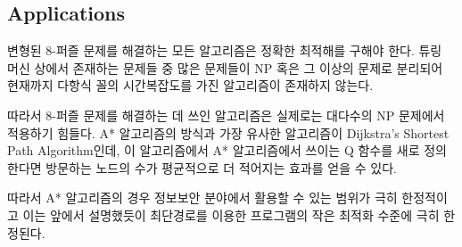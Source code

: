 \documentclass{sig-alternate-05-2015}
\begin{document}
\begin{CJK}{UTF8}{mj}
\subsection{Applications}
변형된 8-퍼즐 문제를 해결하는 모든 알고리즘은 정확한 최적해를 구해야 한다. 튜링 머신 상에서 존재하는 문제들 중 많은 문제들이 NP 혹은 그 이상의 문제로 분리되어 현재까지 다항식 꼴의 시간복잡도를 가진 알고리즘이 존재하지 않는다.

따라서 8-퍼즐 문제를 해결하는 데 쓰인 알고리즘은 실제로는 대다수의 NP 문제에서 적용하기 힘들다. A* 알고리즘의 방식과 가장 유사한 알고리즘이 Dijkstra's Shortest Path Algorithm인데, 이 알고리즘에서 A* 알고리즘에서 쓰이는 Q 함수를 새로 정의한다면 방문하는 노드의 수가 평균적으로 더 적어지는 효과를 얻을 수 있다.

따라서 A* 알고리즘의 경우 정보보안 분야에서 활용할 수 있는 범위가 극히 한정적이고 이는 앞에서 설명했듯이 최단경로를 이용한 프로그램의 작은 최적화 수준에 극히 한정된다.

\end{CJK}
\end{document}
